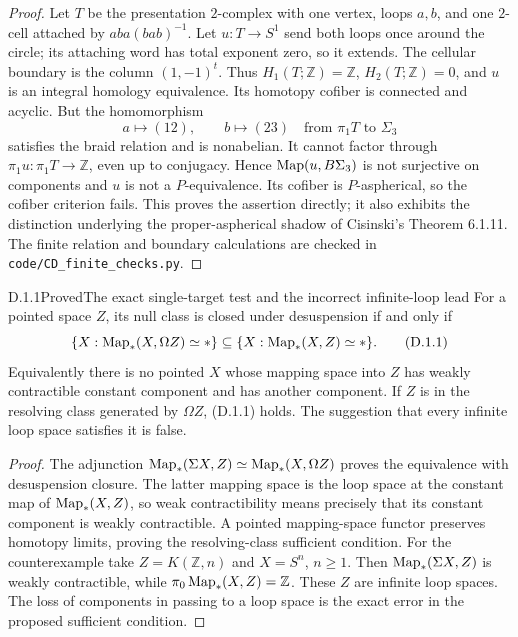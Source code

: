\begin{proof}
Let $T$ be the presentation $2$-complex with one vertex, loops $a,b$, and one $2$-cell attached by $aba(bab)^{-1}$. Let $u:T\to S^1$ send both loops once around the circle; its attaching word has total exponent zero, so it extends. The cellular boundary is the column $(1,-1)^t$. Thus $H_1(T;\mathbb Z)=\mathbb Z$, $H_2(T;\mathbb Z)=0$, and $u$ is an integral homology equivalence. Its homotopy cofiber is connected and acyclic. But the homomorphism
\[
 a\longmapsto(12),\qquad b\longmapsto(23)
 \quad\text{from }\pi_1T\text{ to }\Sigma_3
\]
satisfies the braid relation and is nonabelian. It cannot factor through $\pi_1u:\pi_1T\to\mathbb Z$, even up to conjugacy. Hence $\operatorname{Map}(u,B\Sigma_3)$ is not surjective on components and $u$ is not a $P$-equivalence. Its cofiber is $P$-aspherical, so the cofiber criterion fails. This proves the assertion directly; it also exhibits the distinction underlying the proper-aspherical shadow of Cisinski's Theorem 6.1.11. The finite relation and boundary calculations are checked in \texttt{code/CD\_finite\_checks.py}.
\end{proof}

\begin{claim}{D.1.1}{Proved}{The exact single-target test and the incorrect infinite-loop lead}
For a pointed space $Z$, its null class is closed under desuspension if and only if
\[
 \{X:\operatorname{Map}_*(X,\Omega Z)\simeq *\}
 \subseteq
 \{X:\operatorname{Map}_*(X,Z)\simeq *\}.                         \tag{D.1.1}
\]
Equivalently there is no pointed $X$ whose mapping space into $Z$ has weakly contractible constant component and has another component. If $Z$ is in the resolving class generated by $\Omega Z$, (D.1.1) holds. The suggestion that every infinite loop space satisfies it is false.
\end{claim}
\begin{proof}
The adjunction $\operatorname{Map}_*(\Sigma X,Z)\simeq\operatorname{Map}_*(X,\Omega Z)$ proves the equivalence with desuspension closure. The latter mapping space is the loop space at the constant map of $\operatorname{Map}_*(X,Z)$, so weak contractibility means precisely that its constant component is weakly contractible. A pointed mapping-space functor preserves homotopy limits, proving the resolving-class sufficient condition. For the counterexample take $Z=K(\mathbb Z,n)$ and $X=S^n$, $n\geq1$. Then $\operatorname{Map}_*(\Sigma X,Z)$ is weakly contractible, while $\pi_0\operatorname{Map}_*(X,Z)=\mathbb Z$. These $Z$ are infinite loop spaces. The loss of components in passing to a loop space is the exact error in the proposed sufficient condition.
\end{proof}

